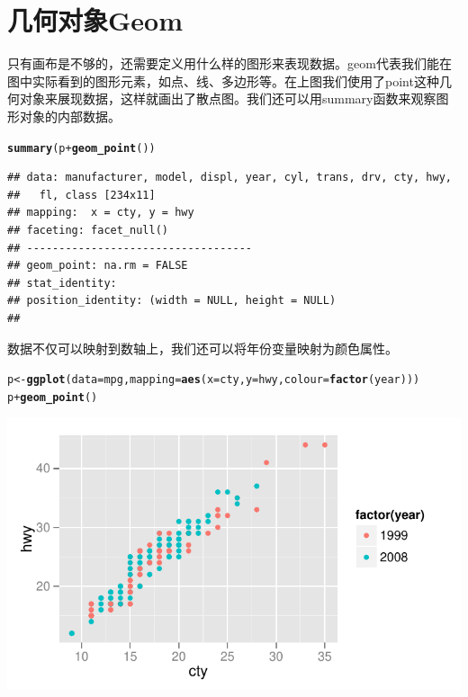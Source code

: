 \documentclass[UTF8,10pt]{ctexart}\usepackage{graphicx, color}
\makeatletter
\def\maxwidth{ %
  \ifdim\Gin@nat@width>\linewidth
    \linewidth
  \else
    \Gin@nat@width
  \fi
}
\newcommand{\hlfunctioncall}[1]{\textcolor[rgb]{0.501960784313725,0,0.329411764705882}{\textbf{#1}}}%
\newenvironment{kframe}{%
 \def\at@end@of@kframe{}%
 \ifinner\ifhmode%
  \def\at@end@of@kframe{\end{minipage}}%
  \begin{minipage}{\columnwidth}%
 \fi\fi%
 \def\FrameCommand##1{\hskip\@totalleftmargin \hskip-\fboxsep
 \colorbox{shadecolor}{##1}\hskip-\fboxsep
     \hskip-\linewidth \hskip-\@totalleftmargin \hskip\columnwidth}%
 \MakeFramed {\advance\hsize-\width
   \@totalleftmargin\z@ \linewidth\hsize
   \@setminipage}}%
 {\par\unskip\endMakeFramed%
 \at@end@of@kframe}
\newenvironment{knitrout}{}{} %
\makeatother
\begin{document}
\section{几何对象Geom}
只有画布是不够的，还需要定义用什么样的图形来表现数据。geom代表我们能在图中实际看到的图形元素，如点、线、多边形等。在上图我们使用了point这种几何对象来展现数据，这样就画出了散点图。我们还可以用summary函数来观察图形对象的内部数据。
\begin{knitrout}
\color{fgcolor}\begin{kframe}
\begin{alltt}
\hlfunctioncall{summary}(p + \hlfunctioncall{geom_point}())
\end{alltt}
\begin{verbatim}
## data: manufacturer, model, displ, year, cyl, trans, drv, cty, hwy,
##   fl, class [234x11]
## mapping:  x = cty, y = hwy
## faceting: facet_null() 
## -----------------------------------
## geom_point: na.rm = FALSE 
## stat_identity:  
## position_identity: (width = NULL, height = NULL)
## 
\end{verbatim}
\end{kframe}
\end{knitrout}

数据不仅可以映射到数轴上，我们还可以将年份变量映射为颜色属性。
\begin{knitrout}
\color{fgcolor}\begin{kframe}
\begin{alltt}
p <- \hlfunctioncall{ggplot}(data=mpg,mapping=\hlfunctioncall{aes}(x=cty,y=hwy,colour=\hlfunctioncall{factor}(year)))
p + \hlfunctioncall{geom_point}()
\end{alltt}
\end{kframe}

{\centering \includegraphics[width=\maxwidth]{figure/unnamed-chunk-3} 

}


\end{knitrout}
\end{document}
